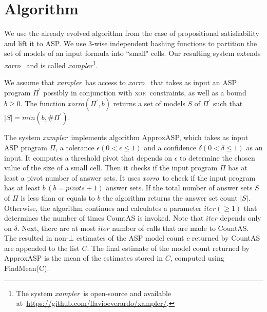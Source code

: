 \documentclass{article}
\newcommand{\XOR}{\textsc{xor}} %
\newcommand{\fff}{\ensuremath{\Pi}\xspace}
\newcommand{\ep}{$\epsilon$\xspace}
\newcommand{\del}{$\delta$\xspace}
\def\appasp{\normalfont \textsf{ApproxASP}\xspace}
\def\countas{\normalfont \textsf{CountAS}\xspace}
\newcommand{\sysfont}{\textit}
\newcommand{\xorro}{\sysfont{xorro}}
\newcommand{\xampler}{\sysfont{xampler}}
\begin{document}
\section{Algorithm} \label{approxasp}
We use the already evolved algorithm from the case of propositional satisfiability~\cite{ChakrabortyMV13} and lift it to ASP.
%
We use 3-wise independent hashing functions to partition the set of models of an input formula into ``small" cells.
%
Our resulting system extends \xorro~\cite{DBLP:conf/lpnmr/EverardoJKS19} and is called \xampler\footnote{The system \xampler\ is open-source and available at~\url{https://github.com/flavioeverardo/xampler/}.}.


We assume that \xampler\ has access to \xorro~\cite{DBLP:conf/lpnmr/EverardoJKS19} that takes as input an ASP program $\fff^{\prime}$ possibly in conjunction with \XOR\ constraints, as well as a bound $b\geq0$.
%
The function \xorro $(\fff^{\prime},b)$ returns a set of models $S$ of $\fff^{\prime}$ such that $|S| = min(b, \#\fff^{\prime})$.
%

The system \xampler\ implements algorithm \appasp, which takes as input ASP program $\fff$, a tolerance \ep $(0 < \epsilon \leq 1)$ and a confidence \del $(0 < \delta \leq 1)$ as an input.
%
It computes a threshold pivot that depends on \ep to determine the chosen value of the size of a small cell.
%
Then it checks if the input program $\fff$ has at least a pivot number of answer sets.
%
It uses \xorro\ to check if the input program has at least $b \, (b = pivots+ 1)$ answer sets.
%
If the total number of answer sets $S$ of $\fff$ is less than or equals to $b$ the algorithm returns the answer set count $|S|$. 
%
Otherwise, the algorithm continues and calculates a parameter $iter (\geq 1)$ that determines the number of times \countas is invoked.
%
Note that $iter$ depends only on \del.
%
Next, there are at most $iter$ number of calls that are made to \countas.
%
The resulted in non-$\bot$ estimates of the ASP model count $c$ returned by \countas are appended to the list $C$. 
%
The final estimate of the model count returned by \appasp is the mean of the estimates stored in $C$, computed using FindMean(C).
\end{document}
